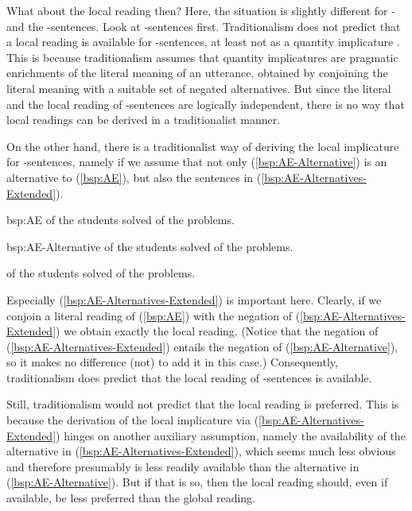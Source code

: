 \documentclass[fleqn,reqno,10pt,draft]{article}
\newcommand{\as}{\acro{as}}
\renewcommand{\es}{\acro{es}}
\newcommand{\mymark}[1]{{\color{mycol}{#1}}}
\begin{document}
What about the local reading then? Here, the situation is slightly
different for \as- and the \es-sentences. Look at \es-sentences
first. Traditionalism does not predict that a local reading is
available for \es-sentences, at least not as a quantity implicature
\citep[c.f.][]{GeurtsPouscoulous2009:Embedded-Implic,ChemlaSpector2010:Experimental-Ev}. This
is because traditionalism assumes that quantity implicatures are
pragmatic enrichments of the literal meaning of an utterance, obtained
by conjoining the literal meaning with a suitable set of negated
alternatives. But since the literal and the local reading of
\es-sentences are logically independent, there is no way that local
readings can be derived in a traditionalist manner.

On the other hand, there is a traditionalist way of deriving the local
implicature for \as-sentences, namely if we assume that not only
(\ref{bsp:AE-Alternative}) is an alternative to (\ref{bsp:AE}), but
also the sentences in (\ref{bsp:AE-Alternatives-Extended}).

\begin{exer}{bsp:AE}
  \ex \mymark{All} of the students solved \mymark{some} of the problems.
\end{exer}

\begin{exer}{bsp:AE-Alternative}
  \ex \mymark{All} of the students solved \mymark{all} of the problems.
\end{exer}

\begin{exe}
\ex \label{bsp:AE-Alternatives-Extended} \mymark{Some} of the students solved \mymark{all} of the problems.
\end{exe}

\noindent Especially (\ref{bsp:AE-Alternatives-Extended}) is
important here. Clearly, if we conjoin a literal reading of
(\ref{bsp:AE}) with the negation of
(\ref{bsp:AE-Alternatives-Extended}) we obtain exactly the
local reading. (Notice that the negation of
(\ref{bsp:AE-Alternatives-Extended}) entails the negation of
(\ref{bsp:AE-Alternative}), so it makes no difference (not) to add it
in this case.) Consequently, traditionalism does predict that the
local reading of \as-sentences is available. 

Still, traditionalism would not predict that the local reading is
preferred. This is because the derivation of the local implicature via
(\ref{bsp:AE-Alternatives-Extended}) hinges on another
auxiliary assumption, namely the availability of the alternative in
(\ref{bsp:AE-Alternatives-Extended}), which seems much less
obvious and therefore presumably is less readily available than the
alternative in (\ref{bsp:AE-Alternative}). But if that is so, then the
local reading should, even if available, be less preferred than the
global reading.
\end{document}
